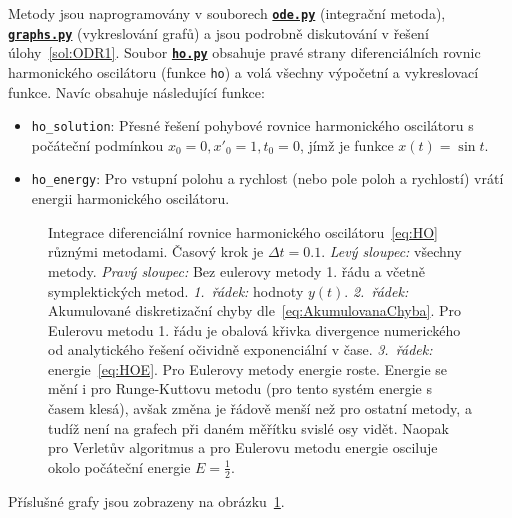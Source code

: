 \documentclass[a4paper,11pt,twoside]{article}
\def\code#1{\textnormal{\texttt{#1}}}
\def\ghfile#1#2{\textnormal{\textbf{\texttt{\href{https://github.com/PavelStransky/PCInPhysics/blob/main/#1#2}{#2}}}}}
\theoremstyle{red}
\theoremstyle{green}
\begin{document}
\begin{solution}
\label{sol:ODRn}
    Metody jsou naprogramovány v souborech \ghfile{python/ode/}{ode.py} (integrační metoda), \ghfile{python/ode/}{graphs.py} (vykreslování grafů) a jsou podrobně diskutování v řešení úlohy~\ref{sol:ODR1}.
    Soubor \ghfile{python/ode/}{ho.py} obsahuje pravé strany diferenciálních rovnic harmonického oscilátoru (funkce \code{ho}) a volá všechny výpočetní a vykreslovací funkce.
    Navíc obsahuje následující funkce:
    \begin{itemize}
    \item \code{ho_solution}:
        Přesné řešení pohybové rovnice harmonického oscilátoru s počáteční podmínkou $x_{0}=0,x'_{0}=1,t_{0}=0$, jímž je funkce $x(t)=\sin t$.
    \item \code{ho_energy}:
        Pro vstupní polohu a rychlost (nebo pole poloh a rychlostí) vrátí energii harmonického oscilátoru.
    \end{itemize}

    \begin{figure}[!htb]
        \begin{subfigure}{0.49\linewidth}
            \centering{}
        \end{subfigure}
        \hfill
        \begin{subfigure}{0.49\linewidth}
            \centering{}
        \end{subfigure}
        \begin{subfigure}{0.49\linewidth}
            \centering{}
        \end{subfigure}
        \hfill
        \begin{subfigure}{0.49\linewidth}
            \centering{}
        \end{subfigure}
        \caption{
            \protect\small
            Integrace diferenciální rovnice harmonického oscilátoru~\eqref{eq:HO} různými metodami.
            Časový krok je $\Delta t=0.1$.
            \emph{Levý sloupec:} všechny metody.
            \emph{Pravý sloupec:} Bez eulerovy metody 1. řádu a včetně symplektických metod.
            \emph{1.~řádek:} hodnoty $y(t)$.
            \emph{2.~řádek:} Akumulované diskretizační chyby dle~\eqref{eq:AkumulovanaChyba}.
            Pro Eulerovu metodu 1. řádu je obalová křivka divergence numerického od analytického řešení očividně exponenciální v čase.
            \emph{3.~řádek:} energie~\eqref{eq:HOE}. 
            Pro Eulerovy metody energie roste.
            Energie se mění i pro Runge-Kuttovu metodu (pro tento systém energie s časem klesá), avšak změna je řádově menší než pro ostatní metody, a tudíž není na grafech při daném měřítku svislé osy vidět.
            Naopak pro Verletův algoritmus a pro  Eulerovu metodu energie osciluje okolo počáteční energie $E=\frac{1}{2}$.
        }	
        \label{fig:HO}
    \end{figure}

    Příslušné grafy jsou zobrazeny na obrázku~\ref{fig:HO}.
\end{solution}
\end{document}
